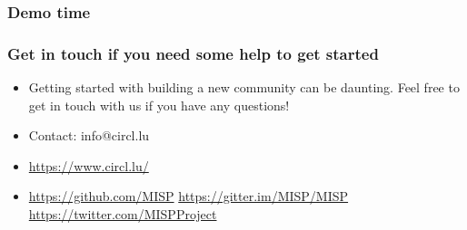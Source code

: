 \begin{frame}
	\frametitle{Demo time}
\end{frame}

\begin{frame}
\frametitle{Get in touch if you need some help to get started}
\begin{itemize}
\item Getting started with building a new community can be daunting. Feel free to get in touch with us if you have any questions!
\item Contact: info@circl.lu
\item \url{https://www.circl.lu/}
\item \url{https://github.com/MISP}  \url{https://gitter.im/MISP/MISP}  \url{https://twitter.com/MISPProject}
\end{itemize}
\end{frame}
